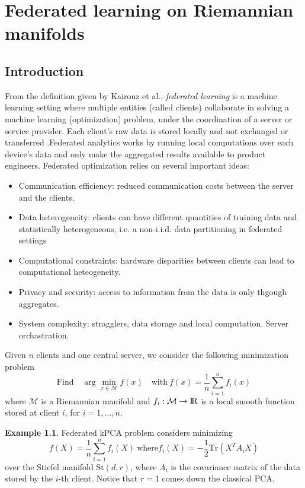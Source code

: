\documentclass[10pt,a4paper]{book}
\theoremstyle{definition}
\newtheorem{exm}{Example}[section]
\theoremstyle{plain}
\theoremstyle{remark}
\newcommand \M {\mathcal{M}}
\newcommand \Stif {\textrm{St}}
\def\R{{\rm I\kern-0.16em R}}
\begin{document}
\chapter{Federated learning on Riemannian manifolds}
\section{Introduction}
From the definition given by Kairouz et al., \emph{federated learning} is a machine learning setting where multiple entities (called clients) collaborate in solving a machine learning (optimization) problem, under the coordination of a server or service provider. Each client's raw data is stored locally and not exchanged or transferred .Federated analytics works by running local computations over each device's data and only make the aggregated results available to product engineers. Federated optimization relies on several important ideas:
\begin{itemize}
\item Communication efficiency: reduced communication costs between the server and the clients.
\item Data heterogeneity: clients can have different quantities of training data and statistically heterogeneous, i.e. a non-i.i.d. data partitioning in federated settings
\item Computational constraints: hardware disparities between clients can lead to computational heteogeneity.
\item Privacy and security: access to information from the data is only thgough aggregates.
\item System complexity: stragglers, data storage and local computation. Server orchastration. 
\end{itemize}
Given $n$ clients and one central server, we consider the following minimization problem
\begin{equation}
\label{eq.FL}
\text{Find}\quad \arg \min_{x\in \M}f(x)\quad\text{with}~f(x)=\frac{1}{n}\sum_{i=1}^{n}f_i(x)
\end{equation}
where $\M$ is a Riemannian manifold and
$f_i:\M\to\R$ is a local smooth function stored at client $i$, for $i=1,\dots, n$.
\begin{exm}
Federated kPCA problem considers minimizing
$$f(X)=\frac{1}{n}\sum_{i=1}^{n}f_i(X)~\text{where}f_i(X)=-\frac{1}{2}\text{Tr}(X^TA_iX)$$
over the Stiefel manifold $\Stif(d,r)$, where $A_i$ is the covariance matrix of the data stored by the $i$-th client. Notice that $r=1$ comes down the classical PCA.
\end{exm}
\end{document}
